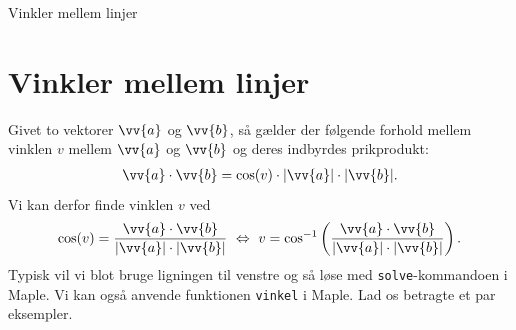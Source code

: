 
\begin{center}
\Huge
Vinkler mellem linjer
\end{center}

\section*{Vinkler mellem linjer}


Givet to vektorer $\vv{a}$ og $\vv{b}$, så gælder der følgende forhold mellem vinklen $v$ mellem $\vv{a}$ og $\vv{b}$ og deres indbyrdes prikprodukt:
\begin{align*}
	\vv{a}\cdot \vv{b} = \cos(v)\cdot |\vv{a}|\cdot |\vv{b}|.
\end{align*}
Vi kan derfor finde vinklen $v$ ved 
\begin{align*}
	\cos(v) = \frac{\vv{a}\cdot \vv{b}}{|\vv{a}|\cdot |\vv{b}|} \ \Leftrightarrow \ v
	= \cos^{-1}\left(\frac{\vv{a}\cdot \vv{b}}{|\vv{a}|\cdot |\vv{b}|}\right).
\end{align*}
Typisk vil vi blot bruge ligningen til venstre og så løse med \texttt{solve}-kommandoen i Maple. Vi kan også anvende funktionen \texttt{vinkel} i Maple. 
Lad os betragte et par eksempler.
